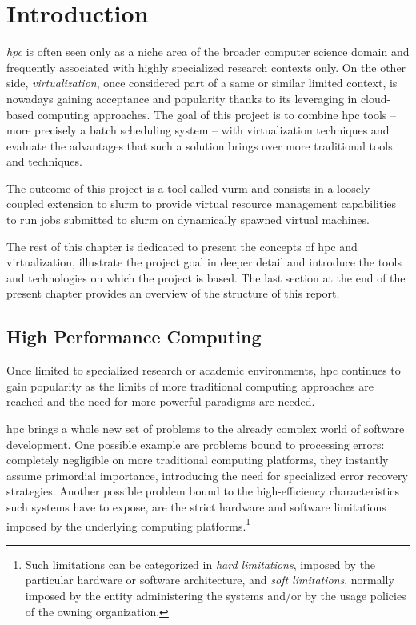 \chapter{Introduction}
\label{sec:introduction}

\emph{\gls{hpc}} is often seen only as a niche area of the broader computer science domain and frequently associated with highly specialized research contexts only. On the other side, \emph{virtualization}, once considered part of a same or similar limited context, is nowadays gaining acceptance and popularity thanks to its leveraging in cloud-based computing approaches. The goal of this project is to combine \gls{hpc} tools -- more precisely a batch scheduling system -- with virtualization techniques and evaluate the advantages that such a solution brings over more traditional tools and techniques.

The outcome of this project is a tool called \gls{vurm} and consists in a loosely coupled extension to \gls{slurm} to provide virtual resource management capabilities to run jobs submitted to \gls{slurm} on dynamically spawned virtual machines.

The rest of this chapter is dedicated to present the concepts of \gls{hpc} and virtualization, illustrate the project goal in deeper detail and introduce the tools and technologies on which the project is based. The last section at the end of the present chapter provides an overview of the structure of this report.



\section{High Performance Computing}
\label{sec:hpc}


Once limited to specialized research or academic environments, \gls{hpc} continues to gain popularity as the limits of more traditional computing approaches are reached and the need for more powerful paradigms are needed. 

\gls{hpc} brings a whole new set of problems to the already complex world of software development. One possible example are problems bound to  processing errors: completely negligible on more traditional computing platforms, they instantly assume primordial importance, introducing the need for specialized error recovery strategies. Another possible problem bound to the high-efficiency characteristics such systems have to expose, are the strict hardware and software limitations imposed by the underlying computing platforms.\footnote{Such limitations can be categorized in \emph{hard limitations}, imposed by the particular hardware or software architecture, and \emph{soft limitations}, normally imposed by the entity administering the systems and/or by the usage policies of the owning organization.}

